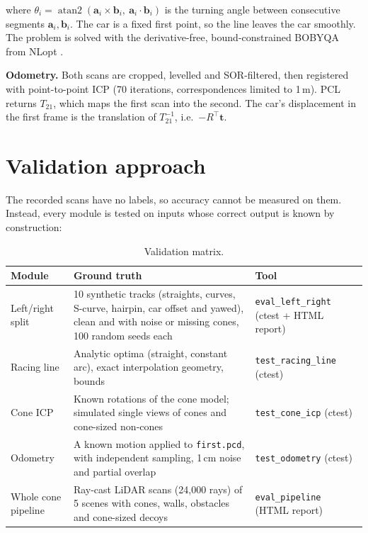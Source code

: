 \documentclass[10pt,a4paper]{scrartcl}
\renewcommand{\emph}[1]{\textcolor{accent}{#1}}
\newcommand{\code}[1]{\texttt{#1}}
\newcommand{\RuleSection}[1]{%
    \section{#1}%
    \vspace{0.2em}{\color{accent!35}\hrule height 0.4pt}\vspace{0.3em}%
  }
\begin{document}
\begin{description}
\begin{equation}
      \end{equation}
      where $\theta_i=\operatorname{atan2}(\bm a_i\times\bm b_i,\ \bm a_i\cdot\bm b_i)$ is the
      turning angle between consecutive segments $\bm a_i,\bm b_i$. The car is a fixed first
      point, so the line leaves the car smoothly. The problem is solved with the derivative-free,
      bound-constrained BOBYQA \citep{powell2009bobyqa} from NLopt \citep{johnson_nlopt}.
    \item[] \textbf{Odometry.} Both scans are cropped, levelled and SOR-filtered, then registered
      with point-to-point ICP (70 iterations, correspondences limited to 1\,m). PCL returns
      $T_{21}$, which maps the first scan into the second. The car's displacement in the first
      frame is the translation of $T_{21}^{-1}$, i.e.\ $-R^\top\bm t$.
  \end{description}

  \RuleSection{Validation approach}
  \label{sec:validation}

  The recorded scans have no labels, so accuracy cannot be measured on them. Instead, every
  module is tested on inputs whose correct output is \emph{known by construction}:

  \begin{table}[htbp]
  \small
  \centering
  \renewcommand{\arraystretch}{1.1}
  \begin{tabularx}{\textwidth}{@{}L{3.3cm} L{5.3cm} X@{}}
  \toprule
  \textbf{Module} & \textbf{Ground truth} & \textbf{Tool} \\
  \midrule
  Left/right split & 10 synthetic tracks (straights, curves, S-curve, hairpin, car offset and yawed), clean and with noise or missing cones, 100 random seeds each & \code{eval\_left\_right} (ctest + HTML report) \\[.15cm]
  Racing line & Analytic optima (straight, constant arc), exact interpolation geometry, bounds & \code{test\_racing\_line} (ctest) \\[.15cm]
  Cone ICP & Known rotations of the cone model; simulated single views of cones and cone-sized non-cones & \code{test\_cone\_icp} (ctest) \\[.15cm]
  Odometry & A known motion applied to \code{first.pcd}, with independent sampling, 1\,cm noise and partial overlap & \code{test\_odometry} (ctest) \\[.15cm]
  Whole cone pipeline & Ray-cast LiDAR scans (24,000 rays) of 5 scenes with cones, walls, obstacles and cone-sized decoys & \code{eval\_pipeline} (HTML report) \\
  \bottomrule
  \end{tabularx}
  \caption{Validation matrix.}
  \label{tab:validation}
  \end{table}
\end{document}
